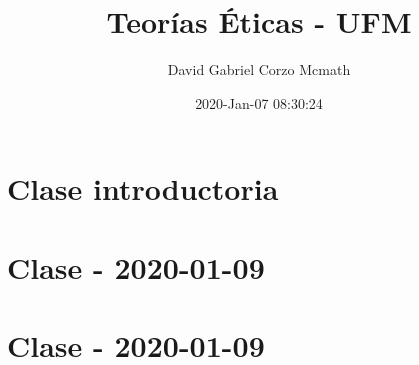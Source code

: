 \documentclass{book}
\title{Teorías Éticas - UFM}
\author{David Gabriel Corzo Mcmath}
\date{2020-Jan-07 08:30:24}
\begin{document}
\maketitle
\tableofcontents

\chapter{Clase introductoria}


\chapter{Clase - 2020-01-09}


\chapter{Clase - 2020-01-09}

\end{document}
